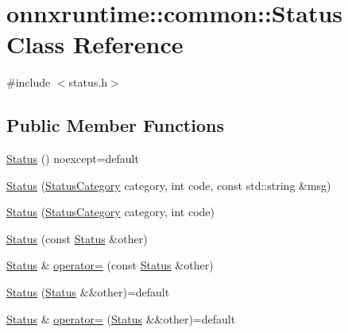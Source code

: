 \hypertarget{classonnxruntime_1_1common_1_1Status}{}\section{onnxruntime\+:\+:common\+:\+:Status Class Reference}
\label{classonnxruntime_1_1common_1_1Status}


{\ttfamily \#include $<$status.\+h$>$}

\subsection*{Public Member Functions}
\begin{DoxyCompactItemize}
\item 
\mbox{\hyperlink{classonnxruntime_1_1common_1_1Status_aecf53098eda21808805fadf3b799aeac}{Status}} () noexcept=default
\item 
\mbox{\hyperlink{classonnxruntime_1_1common_1_1Status_adc2c0cc84bd26eed82c8d480db39d94a}{Status}} (\mbox{\hyperlink{namespaceonnxruntime_1_1common_afab40a94a5b6b651a1c24921d4e5c4d5}{Status\+Category}} category, int code, const std\+::string \&msg)
\item 
\mbox{\hyperlink{classonnxruntime_1_1common_1_1Status_ae8c45d61f46c762f7a5f02ea48680067}{Status}} (\mbox{\hyperlink{namespaceonnxruntime_1_1common_afab40a94a5b6b651a1c24921d4e5c4d5}{Status\+Category}} category, int code)
\item 
\mbox{\hyperlink{classonnxruntime_1_1common_1_1Status_a148a8ac761ac3c6c928043369f3296a7}{Status}} (const \mbox{\hyperlink{classonnxruntime_1_1common_1_1Status}{Status}} \&other)
\item 
\mbox{\hyperlink{classonnxruntime_1_1common_1_1Status}{Status}} \& \mbox{\hyperlink{classonnxruntime_1_1common_1_1Status_ad8ab9084004683c699cdad35a5b6b37f}{operator=}} (const \mbox{\hyperlink{classonnxruntime_1_1common_1_1Status}{Status}} \&other)
\item 
\mbox{\hyperlink{classonnxruntime_1_1common_1_1Status_a59682213a9875c87211e1456c7e3ac2f}{Status}} (\mbox{\hyperlink{classonnxruntime_1_1common_1_1Status}{Status}} \&\&other)=default
\item 
\mbox{\hyperlink{classonnxruntime_1_1common_1_1Status}{Status}} \& \mbox{\hyperlink{classonnxruntime_1_1common_1_1Status_a35d7983d0a17c31f65ecfe9784bd4f29}{operator=}} (\mbox{\hyperlink{classonnxruntime_1_1common_1_1Status}{Status}} \&\&other)=default
\item 

\end{DoxyCompactItemize}
